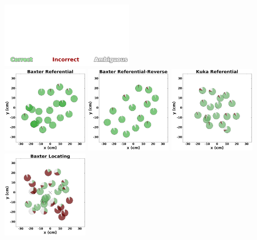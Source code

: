 \documentclass[letterpaper]{article} %
\begin{document}
\begin{figure}[ht!]

    \centering
    \includegraphics[width=0.5\textwidth, trim={0 0 0 3.3in},clip ] {labels.png}\\
    \includegraphics[width=0.325\textwidth ] {baxter_Referential_.png}
    \includegraphics[width=0.325\textwidth ] {baxter_Referential-Reverse_.png}
    \includegraphics[width=0.325\textwidth ]{kuka_Referential_.png}
    \includegraphics[width=0.325\textwidth ]{baxter_Locating_.png}

\end{figure}
\end{document}
